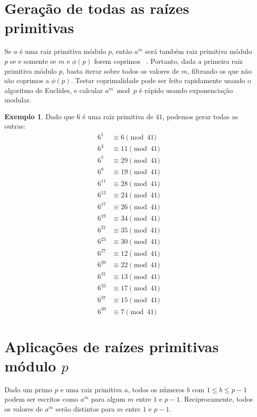 \documentclass{article}
\theoremstyle{definition}
\newtheorem{example}{Exemplo}
\begin{document}
\section{Geração de todas as raízes primitivas}

Se $a$ é uma raiz primitiva módulo $p$,
então $a^m$ será também raiz primitiva módulo $p$
se e somente se $m$ e $\phi(p)$ forem coprimos%
~\cite{PrimitiveRootsStackOverflow}.
Portanto,
dada a primeira raiz primitiva módulo $p$,
basta iterar sobre todos os valores de $m$,
filtrando os que não são coprimos a $\phi(p)$.
Testar coprimalidade pode ser feito rapidamente usando o algoritmo de Euclides,
e calcular $a^m \bmod p$ é rápido usando exponenciação modular.

\begin{example}
    Dado que $6$ é uma raiz primitiva de $41$,
    podemos gerar todas as outras:
    \begin{align*}
        6^1 &\equiv 6 \pmod{41} \\
        6^3 &\equiv 11 \pmod{41} \\
        6^7 &\equiv 29 \pmod{41} \\
        6^9 &\equiv 19 \pmod{41} \\
        6^{11} &\equiv 28 \pmod{41} \\
        6^{13} &\equiv 24 \pmod{41} \\
        6^{17} &\equiv 26 \pmod{41} \\
        6^{19} &\equiv 34 \pmod{41} \\
        6^{21} &\equiv 35 \pmod{41} \\
        6^{23} &\equiv 30 \pmod{41} \\
        6^{27} &\equiv 12 \pmod{41} \\
        6^{29} &\equiv 22 \pmod{41} \\
        6^{31} &\equiv 13 \pmod{41} \\
        6^{33} &\equiv 17 \pmod{41} \\
        6^{37} &\equiv 15 \pmod{41} \\
        6^{39} &\equiv 7 \pmod{41}
    \end{align*}
\end{example}

\section{Aplicações de raízes primitivas módulo $p$}

Dado um primo $p$ e uma raiz primitiva $a$,
todos os números $b$ com $1 \leq b \leq p-1$
podem ser escritos como $a^m$ para algum $m$ entre $1$ e $p-1$.
Reciprocamente,
todos os valores de $a^m$ serão distintos para $m$ entre $1$ e $p-1$.
\end{document}
